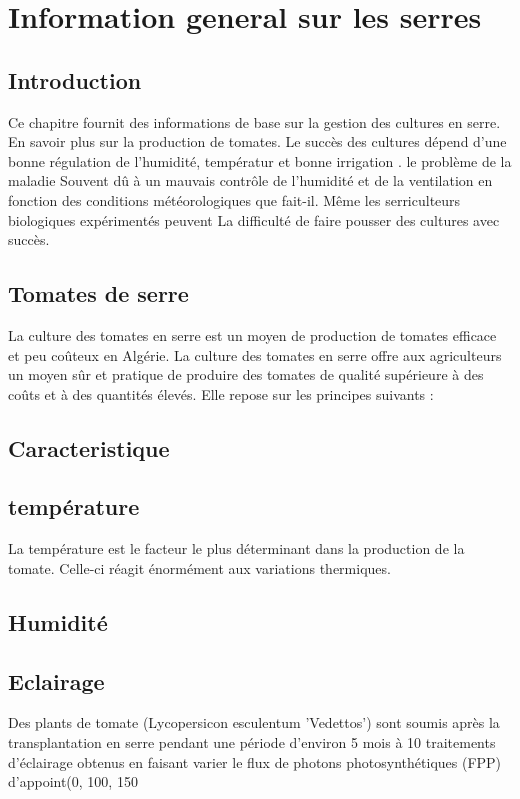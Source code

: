 \chapter{Information general sur les serres } \label{chap:Information general sur les serres}

\section*{Introduction}
Ce chapitre fournit des informations de base sur la gestion des cultures en serre.
En savoir plus sur la production de tomates. 
Le succès des cultures dépend d'une bonne régulation de l'humidité,
 températur et bonne irrigation . le problème de la maladie 
 Souvent dû à un mauvais contrôle de l'humidité et de la ventilation en fonction des conditions météorologiques 
 que fait-il. Même les serriculteurs biologiques expérimentés peuvent 
 La difficulté de faire pousser des cultures avec succès.
 \\
\section*{Tomates de serre }
La culture des tomates en serre est un moyen de production de tomates efficace et peu coûteux en Algérie. La culture des tomates en serre offre aux agriculteurs un moyen sûr et pratique de produire des tomates de qualité supérieure à des coûts et à des quantités élevés.
Elle repose sur les principes suivants :
\section*{Caracteristique}
\section{température}
La température est le facteur le plus déterminant dans la production de la tomate. Celle-ci réagit énormément aux variations thermiques.
\section{Humidité}
\section{Eclairage}
Des plants de tomate (Lycopersicon esculentum 'Vedettos') sont soumis après la transplantation en serre pendant une période d'environ 5 mois à 10 traitements d'éclairage obtenus en faisant varier le flux de photons photosynthétiques (FPP) d'appoint(0, 100, 150
